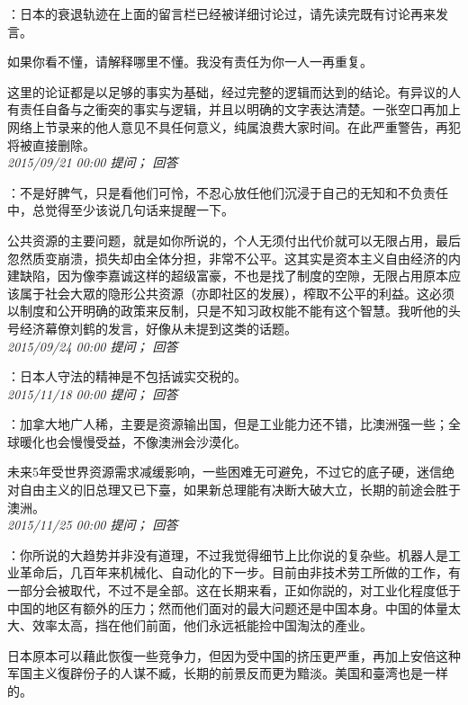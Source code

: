 \documentclass[twocolumn]{ctexart}
\begin{document}
：日本的衰退轨迹在上面的留言栏已经被详细讨论过，请先读完既有讨论再来发言。

如果你看不懂，请解释哪里不懂。我没有责任为你一人一再重复。

这里的论证都是以足够的事实为基础，经过完整的逻辑而达到的结论。有异议的人有责任自备与之衝突的事实与逻辑，并且以明确的文字表达清楚。一张空口再加上网络上节录来的他人意见不具任何意义，纯属浪费大家时间。在此严重警告，再犯将被直接删除。\\

\textit{\hfill\noindent\small 2015/09/21 00:00 提问； 回答}

：不是好脾气，只是看他们可怜，不忍心放任他们沉浸于自己的无知和不负责任中，总觉得至少该说几句话来提醒一下。

公共资源的主要问题，就是如你所说的，个人无须付出代价就可以无限占用，最后忽然质变崩溃，损失却由全体分担，非常不公平。这其实是资本主义自由经济的内建缺陷，因为像李嘉诚这样的超级富豪，不也是找了制度的空隙，无限占用原本应该属于社会大眾的隐形公共资源（亦即社区的发展），榨取不公平的利益。这必须以制度和公开明确的政策来反制，只是不知习政权能不能有这个智慧。我听他的头号经济幕僚刘鹤的发言，好像从未提到这类的话题。\\

\textit{\hfill\noindent\small 2015/09/24 00:00 提问； 回答}

：日本人守法的精神是不包括诚实交税的。\\

\textit{\hfill\noindent\small 2015/11/18 00:00 提问； 回答}

：加拿大地广人稀，主要是资源输出国，但是工业能力还不错，比澳洲强一些；全球暖化也会慢慢受益，不像澳洲会沙漠化。

未来5年受世界资源需求减缓影响，一些困难无可避免，不过它的底子硬，迷信绝对自由主义的旧总理又已下臺，如果新总理能有决断大破大立，长期的前途会胜于澳洲。\\

\textit{\hfill\noindent\small 2015/11/25 00:00 提问； 回答}

：你所说的大趋势并非没有道理，不过我觉得细节上比你说的复杂些。机器人是工业革命后，几百年来机械化、自动化的下一步。目前由非技术劳工所做的工作，有一部分会被取代，不过不是全部。这在长期来看，正如你説的，对工业化程度低于中国的地区有额外的压力；然而他们面对的最大问题还是中国本身。中国的体量太大、效率太高，挡在他们前面，他们永远衹能捡中国淘汰的產业。

日本原本可以藉此恢復一些竞争力，但因为受中国的挤压更严重，再加上安倍这种军国主义復辟份子的人谋不臧，长期的前景反而更为黯淡。美国和臺湾也是一样的。
\end{document}
